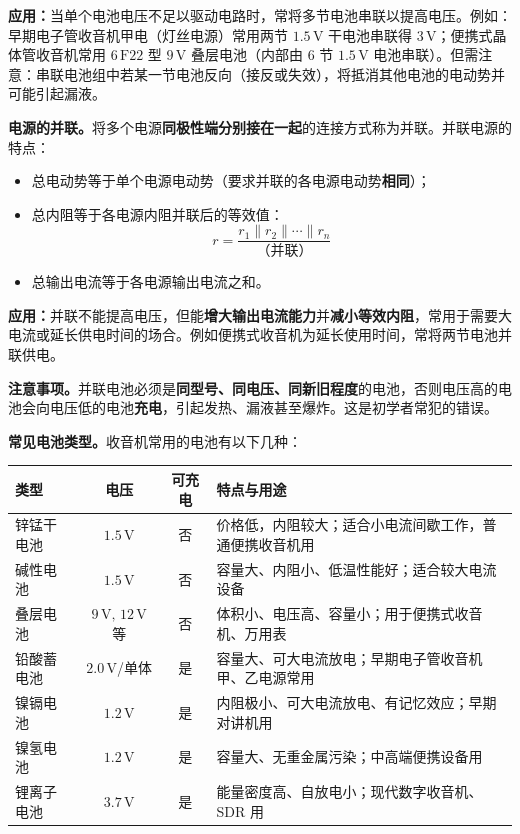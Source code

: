 \documentclass[12pt,UTF8]{ctexbook}
\begin{document}
\textbf{应用：}当单个电池电压不足以驱动电路时，常将多节电池串联以提高电压。例如：早期电子管收音机甲电（灯丝电源）常用两节 $1.5\,\mathrm{V}$ 干电池串联得 $3\,\mathrm{V}$；便携式晶体管收音机常用 $6\,\mathrm{F22}$ 型 $9\,\mathrm{V}$ 叠层电池（内部由 $6$ 节 $1.5\,\mathrm{V}$ 电池串联）。但需注意：串联电池组中若某一节电池反向（接反或失效），将抵消其他电池的电动势并可能引起漏液。

\textbf{电源的并联。}将多个电源\textbf{同极性端分别接在一起}的连接方式称为并联。并联电源的特点：

\begin{itemize}
\item 总电动势等于单个电源电动势（要求并联的各电源电动势\textbf{相同}）；
\item 总内阻等于各电源内阻并联后的等效值：\[
r = \frac{r_1 \parallel r_2 \parallel \cdots \parallel r_n}{\text{（并联）}}
\]
\item 总输出电流等于各电源输出电流之和。
\end{itemize}

\textbf{应用：}并联不能提高电压，但能\textbf{增大输出电流能力}并\textbf{减小等效内阻}，常用于需要大电流或延长供电时间的场合。例如便携式收音机为延长使用时间，常将两节电池并联供电。

\textbf{注意事项。}并联电池必须是\textbf{同型号、同电压、同新旧程度}的电池，否则电压高的电池会向电压低的电池\textbf{充电}，引起发热、漏液甚至爆炸。这是初学者常犯的错误。

\textbf{常见电池类型。}收音机常用的电池有以下几种：

\begin{center}
\begin{tabular}{lccp{6.5cm}}
\hline
\textbf{类型} & \textbf{电压} & \textbf{可充电} & \textbf{特点与用途} \\
\hline
锌锰干电池 & $1.5\,\mathrm{V}$ & 否 & 价格低，内阻较大；适合小电流间歇工作，普通便携收音机用 \\
碱性电池 & $1.5\,\mathrm{V}$ & 否 & 容量大、内阻小、低温性能好；适合较大电流设备 \\
叠层电池 & $9\,\mathrm{V},\,12\,\mathrm{V}$ 等 & 否 & 体积小、电压高、容量小；用于便携式收音机、万用表 \\
铅酸蓄电池 & $2.0\,\mathrm{V}$/单体 & 是 & 容量大、可大电流放电；早期电子管收音机甲、乙电源常用 \\
镍镉电池 & $1.2\,\mathrm{V}$ & 是 & 内阻极小、可大电流放电、有记忆效应；早期对讲机用 \\
镍氢电池 & $1.2\,\mathrm{V}$ & 是 & 容量大、无重金属污染；中高端便携设备用 \\
锂离子电池 & $3.7\,\mathrm{V}$ & 是 & 能量密度高、自放电小；现代数字收音机、SDR 用 \\
\hline
\end{tabular}
\end{center}
\end{document}
